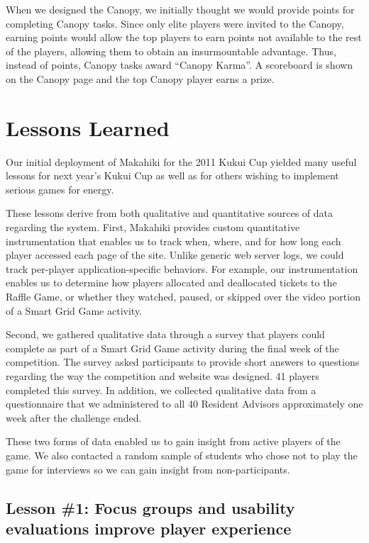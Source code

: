 \documentclass{acm_proc_article-sp}
\begin{document}
When we designed the Canopy, we initially thought we would provide points for completing Canopy tasks. Since only elite players were invited to the Canopy, earning points would allow the top players to earn points not available to the rest of the players, allowing them to obtain an insurmountable advantage. Thus, instead of points, Canopy tasks award ``Canopy Karma''. A scoreboard is shown on the Canopy page and the top Canopy player earns a prize.

\section{Lessons Learned}

Our initial deployment of Makahiki for the 2011 Kukui Cup yielded many
useful lessons for next year's Kukui Cup as well as for others wishing to
implement serious games for energy. 

These lessons derive from both qualitative and quantitative sources of data
regarding the system.  First, Makahiki provides custom
quantitative instrumentation that enables us to track when, where, and for how
long each player accessed each page of the site.  Unlike generic web server
logs, we could track per-player application-specific behaviors. For example,
our instrumentation enables us to determine how players allocated and
deallocated tickets to the Raffle Game, or whether they watched, paused, or
skipped over the video portion of a Smart Grid Game activity.

Second, we gathered qualitative data through a survey that players could complete as part of a Smart Grid Game activity during the final week of the competition. The survey asked participants to provide short answers to questions regarding the way the competition and website was designed.  41 players completed this survey.  In addition, we collected qualitative data from a questionnaire that we administered to all 40 Resident Advisors approximately one week after the challenge ended. 

These two forms of data enabled us to gain insight from active players of
the game. We also contacted a random sample of students who chose not to play the game for interviews so we can gain insight from non-participants.

\subsection{Lesson \#1: Focus groups and usability evaluations improve player
  experience}
\end{document}
